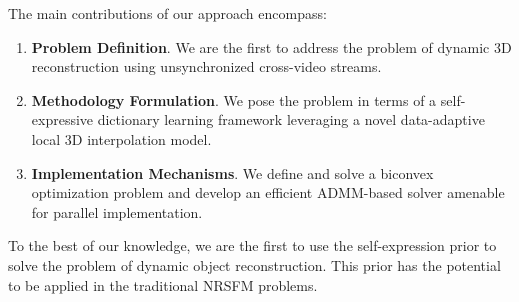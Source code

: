 
The main contributions of our approach encompass:
\begin{enumerate}%
\item {\bf Problem Definition}. We are the first to address the problem of dynamic 3D reconstruction using unsynchronized cross-video streams.
\item {\bf Methodology Formulation}. We pose the problem in terms of a self-expressive dictionary learning framework leveraging a novel data-adaptive local 3D interpolation model.  
\item {\bf Implementation Mechanisms}. We define and solve a biconvex optimization problem and develop an efficient ADMM-based solver amenable for parallel implementation.
\end{enumerate}
To the best of our knowledge, we are the first to use the self-expression prior to solve the problem of dynamic object reconstruction. This prior has the potential to be applied in the traditional NRSFM problems.




